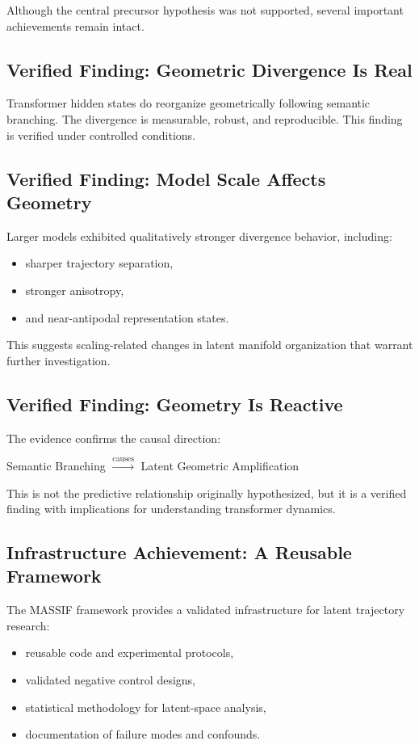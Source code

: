 \documentclass[12pt,a4paper]{article}
\begin{document}
Although the central precursor hypothesis was not supported, several important achievements remain intact.

\subsection*{Verified Finding: Geometric Divergence Is Real}

Transformer hidden states do reorganize geometrically following semantic branching. The divergence is measurable, robust, and reproducible. This finding is verified under controlled conditions.

\subsection*{Verified Finding: Model Scale Affects Geometry}

Larger models exhibited qualitatively stronger divergence behavior, including:
\begin{itemize}
    \item sharper trajectory separation,
    \item stronger anisotropy,
    \item and near-antipodal representation states.
\end{itemize}

This suggests scaling-related changes in latent manifold organization that warrant further investigation.

\subsection*{Verified Finding: Geometry Is Reactive}

The evidence confirms the causal direction:

\begin{center}
Semantic Branching $\xrightarrow{\text{causes}}$ Latent Geometric Amplification
\end{center}

This is not the predictive relationship originally hypothesized, but it is a verified finding with implications for understanding transformer dynamics.

\subsection*{Infrastructure Achievement: A Reusable Framework}

The MASSIF framework provides a validated infrastructure for latent trajectory research:
\begin{itemize}
    \item reusable code and experimental protocols,
    \item validated negative control designs,
    \item statistical methodology for latent-space analysis,
    \item documentation of failure modes and confounds.
\end{itemize}
\end{document}
